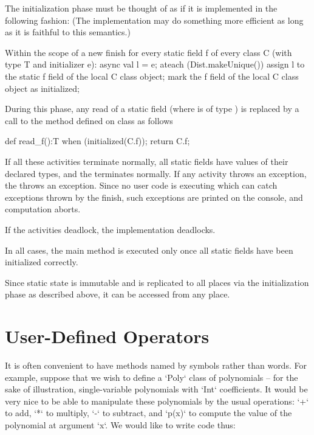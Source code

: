 The initialization phase must be thought of as if it is implemented in
the following fashion: (The implementation may do something more
efficient as long as it is faithful to this semantics.)

\begin{xten}
Within the scope of a new finish
for every static field f of every class C 
   (with type T and initializer e):
async {
  val l = e; 
  ateach (Dist.makeUnique()) {
     assign l to the static f field of 
         the local C class object;
     mark the f field of the local C 
         class object as initialized;
  }
}
\end{xten}

During this phase, any read of a static field  (where  is of type )
is replaced by a call to the method  defined on class 
as follows

\begin{xten}
def read_f():T {
   when (initialized(C.f)){};
   return C.f;
}
\end{xten}
 

If all these activities terminate normally, all static fields have values of
their declared types, 
and the  terminates normally. If
any activity throws an exception, the  throws an
exception. Since no user code is executing which can catch exceptions
thrown by the finish, such exceptions are printed on the console, and
computation aborts.

If the activities deadlock, the implementation deadlocks.

In all cases, the main method is executed only once all static fields
have been initialized correctly.

Since static state is immutable and is replicated to all places via 
the initialization phase as described above, it can be accessed from
any place.



\section{User-Defined Operators}

It is often convenient to have methods named by symbols rather than words.
For example, suppose that we wish to define a \xcd`Poly` class of
polynomials -- for the sake of illustration, single-variable polynomials with
\xcd`Int` coefficients.  It would be very nice to be able to manipulate these
polynomials by the usual operations: \xcd`+` to add, \xcd`*` to multiply,
\xcd`-` to subtract, and \xcd`p(x)` to compute the value of the polynomial at
argument \xcd`x`.  We would like to write code thus: 


